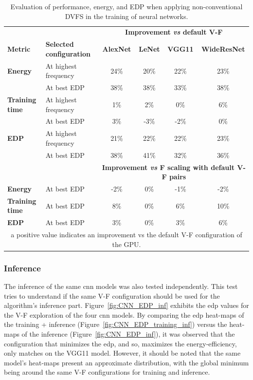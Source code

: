 \begin{table}[htbp]
    \centering
    \label{tab:trainingMetricsResults}
    \begin{tabular}{llcccc}
        &  &  \multicolumn{4}{c}{\textbf{Improvement {\it vs} default V-F}} \\ 
        \cline{3-6} 
        \bf Metric &  \bf Selected configuration &    \textbf{AlexNet} &  \textbf{LeNet} &  \textbf{VGG11} &  \textbf{WideResNet} \\ \hline
        \textbf{Energy}        & At highest frequency & 24\% & 20\% & 22\% & 23\% \\
        \textbf{}              & At best EDP          & 38\% & 38\% & 33\% & 38\% \\\hline
        \textbf{Training time} & At highest frequency & 1\%  & 2\%  & 0\%  & 6\%  \\
        \textbf{}              & At best EDP          & 3\%  & -3\% & -2\% & 0\% \\\hline
        \textbf{EDP}           & At highest frequency & 21\% & 22\% & 22\% & 23\% \\
        \textbf{}              & At best EDP          & 38\% & 41\% & 32\% & 36\% \\ \hline
        
        &  &\multicolumn{4}{c}{\textbf{Improvement {\it vs} F scaling with default V-F pairs}} \\ \hline
        \textbf{Energy}        &At best EDP&  -2\% & 0\% & -1\% & -2\% \\\hline
        \textbf{Training time} &At best EDP&  8\%  & 0\%  & 6\%  & 10\%  \\\hline
        \textbf{EDP}           &At best EDP&  3\% & 0\% & 3\% & 6\% \\ \hline
        \multicolumn{6}{c}{a positive value indicates an improvement vs the default V-F configuration of the GPU.} \\
    \end{tabular}%
    \caption{Evaluation of performance, energy, and EDP when applying non-conventional DVFS in the training of neural networks.}
\end{table}


\subsubsection{Inference}

The inference of the same \acrshort{cnn} models was also tested independently. This test tries to understand if the same V-F configuration should be used for the algorithm's inference part. Figure~\ref{fig:CNN_EDP_inf} exhibits the \acrshort{edp} values for the V-F exploration of the four \acrshort{cnn} models. By comparing the \acrshort{edp} heat-maps of the training + inference (Figure~\ref{fig:CNN_EDP_training_inf}) versus the heat-maps of the inference (Figure~\ref{fig:CNN_EDP_inf}), it was observed that the configuration that minimizes the \acrshort{edp}, and so, maximizes the energy-efficiency, only matches on the VGG11 model. However, it should be noted that the same model's heat-maps present an approximate distribution, with the global minimum being around the same V-F configurations for training and inference.

